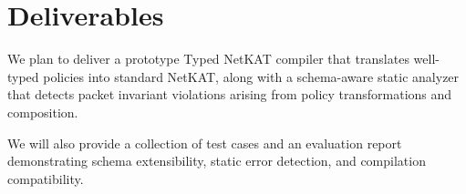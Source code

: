 \section{Deliverables}

We plan to deliver a prototype Typed NetKAT compiler that translates well-typed policies into standard NetKAT, along with a schema-aware static analyzer that detects packet invariant violations arising from policy transformations and composition.

We will also provide a collection of test cases and an evaluation report demonstrating schema extensibility,
static error detection, and compilation compatibility.